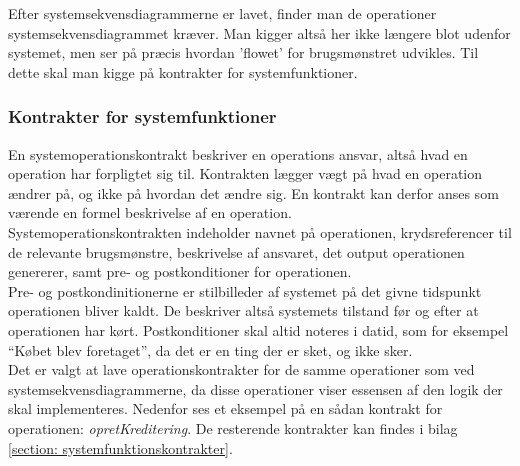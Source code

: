 \noindent
Efter systemsekvensdiagrammerne er lavet, finder man de operationer systemsekvensdiagrammet kræver. Man kigger altså her ikke længere blot udenfor systemet, men ser på præcis hvordan 'flowet' for brugsmønstret udvikles. Til dette skal man kigge på kontrakter for systemfunktioner.


\subsubsection{Kontrakter for systemfunktioner}
En systemoperationskontrakt beskriver en operations ansvar, altså hvad en operation har forpligtet sig til. Kontrakten lægger vægt på hvad en operation ændrer på, og ikke på hvordan det ændre sig. En kontrakt kan derfor anses som værende en formel beskrivelse af en operation.\\
Systemoperationskontrakten indeholder navnet på operationen, krydsreferencer til de relevante brugsmønstre, beskrivelse af ansvaret, det output operationen genererer, samt pre- og postkonditioner for operationen. \\

\noindent
Pre- og postkondinitionerne er stilbilleder af systemet på det givne tidspunkt operationen bliver kaldt. De beskriver altså systemets tilstand før og efter at operationen har kørt. Postkonditioner skal altid noteres i datid, som for eksempel “Købet blev foretaget”, da det er en ting der er sket, og ikke sker.\\

\noindent
Det er valgt at lave operationskontrakter for de samme operationer som ved systemsekvensdiagrammerne, da disse operationer viser essensen af den logik der skal implementeres. Nedenfor ses et eksempel på en sådan kontrakt for operationen: \textit{opretKreditering}. De resterende kontrakter kan findes i bilag \ref{section: systemfunktionskontrakter}.


